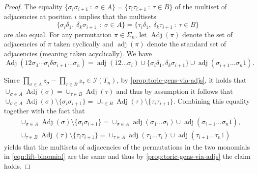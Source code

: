\documentclass[10pt,a4paper]{amsart}
\DeclareMathOperator{\Adj}{Adj}
\DeclareMathOperator{\adj}{adj}
\newcommand{\ci}{\mathcal{I}}
\begin{document}
\begin{proof}
The equality $\{ \sigma_i \sigma_{i+1} ~:~ \sigma \in A \} = \{\tau_i \tau_{i+1}~:~ \tau \in B \}$ of the multiset of adjacencies at position $i$ implies 
that the multisets
\[
\{ \sigma_i \delta_1,~ \delta_k \sigma_{i+1} ~~:~ \sigma \in A \} = \{ \tau_i \delta_1,~ \delta_k \tau_{i+1} ~:~ \tau \in B\}
\]
are also equal. For any permutation $\pi \in \Sigma_n$, let $\Adj(\pi)$ denote the set of adjacencies of $\pi$ taken cyclically and $\adj(\pi)$ denote the standard set of adjacencies (meaning taken acyclically). We have
\begin{equation}
\label{eqn:lift-perm-adj-decomp}
\Adj(12 \sigma_3 \cdots \sigma_i \delta \sigma_{i+1} \ldots \sigma_n) = \adj(12\ldots \sigma_i) \cup\{\sigma_i \delta_1, \delta_k \sigma_{i+1
} \} \cup \adj(\sigma_{i+1} \ldots \sigma_n 1).   
\end{equation}


Since $\prod_{\sigma\in A} z_\sigma - \prod_{\tau\in B} z_\tau \in \ci(T_n)$, by \cref{prop:toric-gens-via-adjs}, it holds that $\cup_{\sigma \in A} \Adj(\sigma) = \cup_{\tau \in B} \Adj(\tau)$ and thus by assumption it follows that $\cup_{\sigma \in A} \Adj(\sigma) \setminus \{\sigma_i \sigma_{i+1}\} = \cup_{\tau \in B} \Adj(\tau) \setminus \{\tau_i \tau_{i+1}\}$. Combining this equality together with the fact that
\begin{align}
\label{eqn:perm-union-decomp}
&\cup_{\sigma \in A} \Adj(\sigma) \setminus \{\sigma_i \sigma_{i+1} \} = \cup_{\sigma \in A} \adj(\sigma_1 \ldots \sigma_i) \cup \adj(\sigma_{i+1} \ldots \sigma_n 1), \\
&\cup_{\tau \in B} \Adj(\tau) \setminus \{\tau_i \tau_{i+1}\} = \cup_{\tau\in A} \adj(\tau_1 \ldots \tau_i) \cup \adj(\tau_{i+1} \ldots \tau_n 1)
\end{align}
yields that the multisets of adjacencies of the permutations in the two monomials in \cref{eqn:lift-binomial} are the same and thus by \cref{prop:toric-gens-via-adjs} the claim holds. 
\end{proof}
\end{document}
